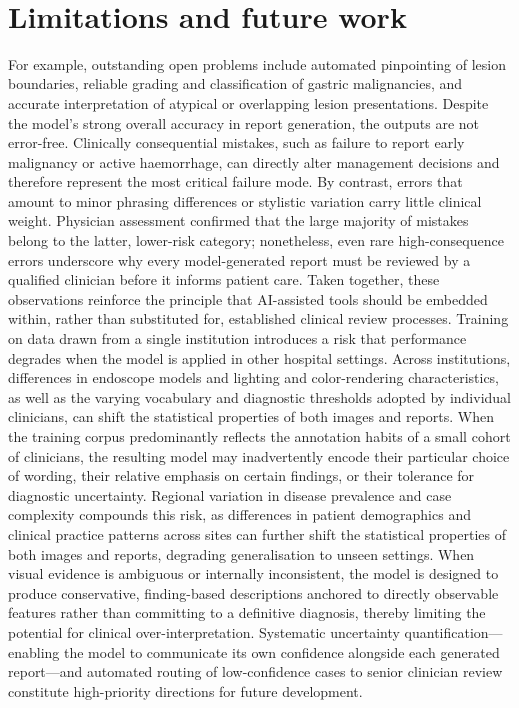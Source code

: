 ﻿﻿\documentclass[12pt]{report}
\begin{document}
\section{Limitations and future work}
For example, outstanding open problems include automated pinpointing of lesion boundaries, reliable grading and classification of gastric malignancies, and accurate interpretation of atypical or overlapping lesion presentations.
Despite the model's strong overall accuracy in report generation, the outputs are not error-free. Clinically consequential mistakes, such as failure to report early malignancy or active haemorrhage, can directly alter management decisions and therefore represent the most critical failure mode. By contrast, errors that amount to minor phrasing differences or stylistic variation carry little clinical weight. Physician assessment confirmed that the large majority of mistakes belong to the latter, lower-risk category; nonetheless, even rare high-consequence errors underscore why every model-generated report must be reviewed by a qualified clinician before it informs patient care. Taken together, these observations reinforce the principle that AI-assisted tools should be embedded within, rather than substituted for, established clinical review processes. Training on data drawn from a single institution introduces a risk that performance degrades when the model is applied in other hospital settings. Across institutions, differences in endoscope models and lighting and color-rendering characteristics, as well as the varying vocabulary and diagnostic thresholds adopted by individual clinicians, can shift the statistical properties of both images and reports. When the training corpus predominantly reflects the annotation habits of a small cohort of clinicians, the resulting model may inadvertently encode their particular choice of wording, their relative emphasis on certain findings, or their tolerance for diagnostic uncertainty. Regional variation in disease prevalence and case complexity compounds this risk, as differences in patient demographics and clinical practice patterns across sites can further shift the statistical properties of both images and reports, degrading generalisation to unseen settings. When visual evidence is ambiguous or internally inconsistent, the model is designed to produce conservative, finding-based descriptions anchored to directly observable features rather than committing to a definitive diagnosis, thereby limiting the potential for clinical over-interpretation. Systematic uncertainty quantification—enabling the model to communicate its own confidence alongside each generated report—and automated routing of low-confidence cases to senior clinician review constitute high-priority directions for future development.
\end{document}
